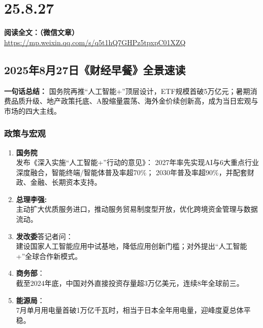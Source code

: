 \chapter{25.8.27}
\vspace{1cm}
\noindent\textbf{阅读全文：（微信文章）} \url{https://mp.weixin.qq.com/s/q5t1hQ7GHPz5tpxpC01XZQ}

\section{2025年8月27日《财经早餐》全景速读}
\textbf{一句话总结：}  
国务院再推“人工智能+”顶层设计，ETF规模首破5万亿元；暑期消费品质升级、地产政策托底、A股缩量震荡、海外金价续创新高，成为当日宏观与市场的四大主线。

\subsection{政策与宏观}
\begin{enumerate}[leftmargin=*, nosep]
    \item \textbf{国务院}\\
    发布《深入实施“人工智能+”行动的意见》：  
    2027年率先实现AI与6大重点行业深度融合，智能终端/智能体普及率超70\%；  
    2030年普及率超90\%，并配套财政、金融、长期资本支持。
    \item \textbf{总理李强:}\\  
    主动扩大优质服务进口，推动服务贸易制度型开放，优化跨境资金管理与数据流动。
    \item \textbf{发改委}答记者问：  \\
    建设国家人工智能应用中试基地，降低应用创新门槛；对外提出“人工智能+”全球合作新模式。
    \item \textbf{商务部}：  \\
    截至2024年底，中国对外直接投资存量超3万亿美元，连续8年全球前三。
    \item \textbf{能源局}：  \\
    7月单月用电量首破1万亿千瓦时，相当于日本全年用电量，迎峰度夏总体平稳。
\end{enumerate}

